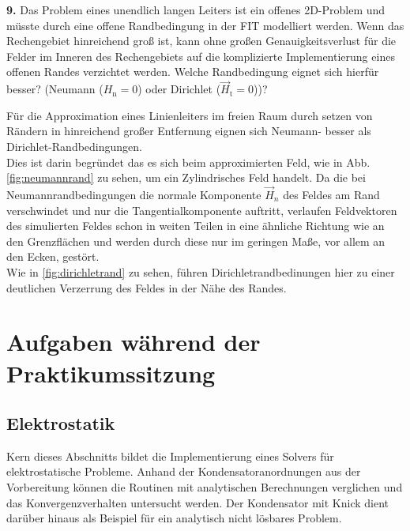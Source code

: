 \documentclass[Protokollheft.tex]{subfiles}
\begin{document}
\begin{framed}
	\noindent \textbf{9.} Das Problem eines unendlich langen Leiters ist ein
offenes 2D-Problem und müsste durch eine offene
Randbedingung in der FIT modelliert werden. Wenn das
Rechengebiet hinreichend groß ist, kann ohne großen
Genauigkeitsverlust für die Felder im Inneren des Rechengebiets
auf die komplizierte Implementierung eines offenen Randes
verzichtet werden. Welche Randbedingung eignet sich hierfür besser? (Neumann ($H_{\text{n}}=0$) oder Dirichlet ($\vec{H}_{\text{t}}=0$))?\label{exer:boundCondInfiniteConductor}
\end{framed}
\noindent
Für die Approximation eines Linienleiters im freien Raum durch setzen von Rändern in hinreichend großer Entfernung eignen sich Neumann- besser als Dirichlet-Randbedingungen.\\
Dies ist darin begründet das es sich beim approximierten Feld, wie in Abb. \ref{fig:neumannrand} zu sehen, um ein Zylindrisches Feld handelt. Da die bei Neumannrandbedingungen die normale Komponente $\vec{H}_n$ des Feldes am Rand verschwindet und nur die Tangentialkomponente auftritt, verlaufen Feldvektoren des simulierten Feldes schon in weiten Teilen in eine ähnliche Richtung wie an den Grenzflächen und werden durch diese nur im geringen Maße, vor allem an den Ecken, gestört. \\
Wie in \ref{fig:dirichletrand} zu sehen, führen Dirichletrandbedinungen hier zu einer deutlichen Verzerrung des Feldes in der Nähe des Randes.   



\section{Aufgaben während der Praktikumssitzung}

{\subsection{Elektrostatik}}

Kern dieses Abschnitts bildet die Implementierung eines Solvers für elektrostatische
Probleme. Anhand der Kondensatoranordnungen aus der Vorbereitung können die
Routinen mit analytischen Berechnungen verglichen und das Konvergenzverhalten
untersucht werden. Der Kondensator mit Knick dient darüber hinaus als Beispiel
für ein analytisch nicht lösbares Problem.
\end{document}
